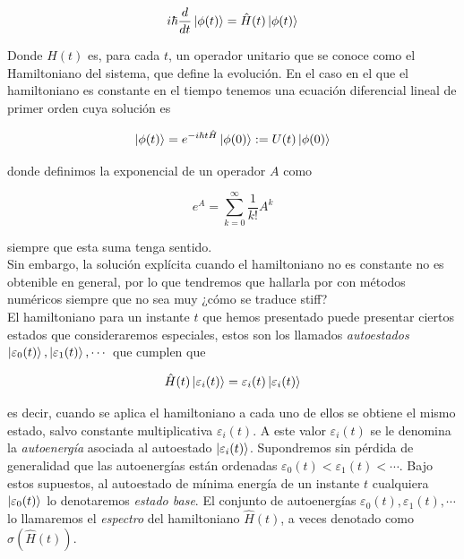\documentclass[11pt, spanish]{report}
\numberwithin{equation}{section}
\numberwithin{defin}{section}
\begin{document}
\begin{equation}\label{mySchr}
i\hbar\frac{d}{d t}\ket{\phi(t)}=\hat{H}(t)\ket{\phi(t)}
\end{equation}

Donde $H(t)$ es, para cada $t$, un operador unitario que se conoce como el Hamiltoniano del sistema, que define la evolución. En el caso en el que el hamiltoniano es constante en el tiempo tenemos una ecuación diferencial lineal de primer orden cuya solución es

\begin{equation}\label{expEv}
\ket{\phi(t)}=e^{-i\hbar t\hat{H}}\ket{\phi(0)}:=U(t)\ket{\phi(0)}
\end{equation}

donde definimos la exponencial de un operador $A$ como

\begin{equation}
e^A=\sum_{k=0}^\infty \frac{1}{k!}A^k
\end{equation}

siempre que esta suma tenga sentido.\\

Sin embargo, la solución explícita cuando el hamiltoniano no es constante no es obtenible en general, por lo que tendremos que hallarla por con métodos numéricos siempre que no sea muy ¿cómo se traduce stiff?\\

El hamiltoniano para un instante $t$ que hemos presentado puede presentar ciertos estados que consideraremos especiales, estos son los llamados \textit{autoestados} $\ket{\varepsilon_0(t)},\ket{\varepsilon_1(t)},\cdots$ que cumplen que

\begin{equation}
\hat{H}(t)\ket{\varepsilon_i(t)}=\varepsilon_i(t)\ket{\varepsilon_i(t)}
\end{equation}

es decir, cuando se aplica el hamiltoniano a cada uno de ellos se obtiene el mismo estado, salvo constante multiplicativa $\varepsilon_i(t)$. A este valor $\varepsilon_i(t)$ se le denomina la \textit{autoenergía} asociada al autoestado $\ket{\varepsilon_i(t)}$. Supondremos sin pérdida de generalidad que las autoenergías están ordenadas $\varepsilon_0(t)<\varepsilon_1(t)<\cdots$. Bajo estos supuestos, al autoestado de mínima energía de un instante $t$ cualquiera $\ket{\varepsilon_0(t)}$ lo denotaremos \textit{estado base}. El conjunto de autoenergías $\varepsilon_0(t),\varepsilon_1(t),\cdots$ lo llamaremos el \emph{espectro} del hamiltoniano $\hat{H}(t)$, a veces denotado como $\sigma(\hat{H}(t))$.\\
\end{document}
